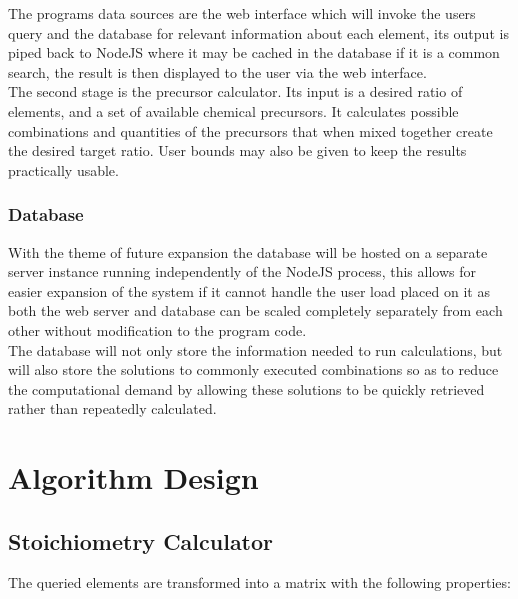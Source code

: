 \documentclass[a4paper, 12pt]{article}
\begin{document}
The programs data sources are the web interface which will invoke the users query and the database for relevant information about each element, its output is piped back to NodeJS where it may be cached in the database if it is a common search, the result is then displayed to the user via the web interface. \\

The second stage is the precursor calculator. Its input is a desired ratio of elements, and a set of available chemical precursors. It calculates possible combinations and quantities of the precursors that when mixed together create the desired target ratio. User bounds may also be given to keep the results practically usable.


\subsubsection{Database}
With the theme of future expansion the database will be hosted on a separate server instance running independently of the NodeJS process, this allows for easier expansion of the system if it cannot handle the user load placed on it as both the web server and database can be scaled completely separately from each other without modification to the program code. \\ 

The database will not only store the information needed to run calculations, but will also store the solutions to commonly executed combinations so as to reduce the computational demand by allowing these solutions to be quickly retrieved rather than repeatedly calculated.
\pagebreak

\section{Algorithm Design}
\subsection{Stoichiometry Calculator}
The queried elements are transformed into a matrix with the following properties:
\end{document}
